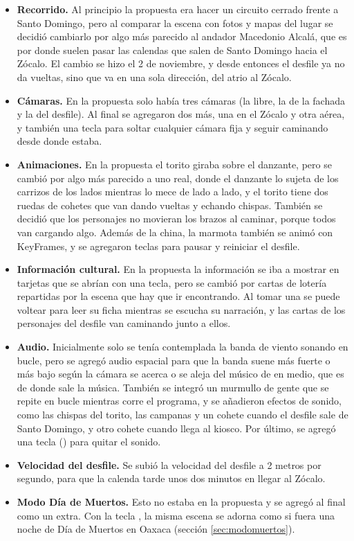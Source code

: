 \documentclass[11pt,a4paper]{article}
\begin{document}
\begin{itemize}
  \item \textbf{Recorrido.} Al principio la propuesta era hacer un circuito cerrado frente a Santo Domingo, pero al comparar la escena con fotos y mapas del lugar se decidió cambiarlo por algo más parecido al andador Macedonio Alcalá, que es por donde suelen pasar las calendas que salen de Santo Domingo hacia el Zócalo. El cambio se hizo el 2 de noviembre, y desde entonces el desfile ya no da vueltas, sino que va en una sola dirección, del atrio al Zócalo.
  \item \textbf{Cámaras.} En la propuesta solo había tres cámaras (la libre, la de la fachada y la del desfile). Al final se agregaron dos más, una en el Zócalo y otra aérea, y también una tecla para soltar cualquier cámara fija y seguir caminando desde donde estaba.
  \item \textbf{Animaciones.} En la propuesta el torito giraba sobre el danzante, pero se cambió por algo más parecido a uno real, donde el danzante lo sujeta de los carrizos de los lados mientras lo mece de lado a lado, y el torito tiene dos ruedas de cohetes que van dando vueltas y echando chispas. También se decidió que los personajes no movieran los brazos al caminar, porque todos van cargando algo. Además de la china, la marmota también se animó con KeyFrames, y se agregaron teclas para pausar y reiniciar el desfile.
  \item \textbf{Información cultural.} En la propuesta la información se iba a mostrar en tarjetas que se abrían con una tecla, pero se cambió por cartas de lotería repartidas por la escena que hay que ir encontrando. Al tomar una se puede voltear para leer su ficha mientras se escucha su narración, y las cartas de los personajes del desfile van caminando junto a ellos.
  \item \textbf{Audio.} Inicialmente solo se tenía contemplada la banda de viento sonando en bucle, pero se agregó audio espacial para que la banda suene más fuerte o más bajo según la cámara se acerca o se aleja del músico de en medio, que es de donde sale la música. También se integró un murmullo de gente que se repite en bucle mientras corre el programa, y se añadieron efectos de sonido, como las chispas del torito, las campanas y un cohete cuando el desfile sale de Santo Domingo, y otro cohete cuando llega al kiosco. Por último, se agregó una tecla () para quitar el sonido.
  \item \textbf{Velocidad del desfile.} Se subió la velocidad del desfile a 2 metros por segundo, para que la calenda tarde unos dos minutos en llegar al Zócalo.
  \item \textbf{Modo Día de Muertos.} Esto no estaba en la propuesta y se agregó al final como un extra. Con la tecla , la misma escena se adorna como si fuera una noche de Día de Muertos en Oaxaca (sección \ref{sec:modomuertos}).
\end{itemize}
\end{document}

